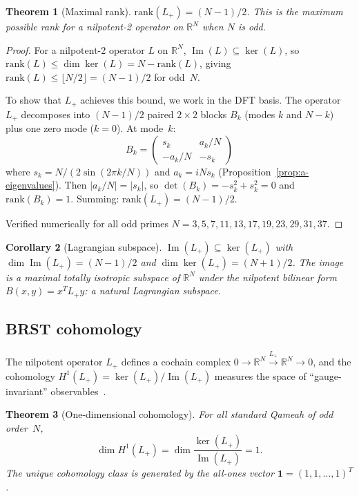 \documentclass[aip,jmp,reprint,superscriptaddress,floatfix,nofootinbib]{revtex4-2}
\newtheorem{theorem}{Theorem}
\newtheorem{corollary}[theorem]{Corollary}
\theoremstyle{definition}
\theoremstyle{remark}
\begin{document}
\begin{theorem}[Maximal rank]
\label{thm:maxrank}
$\mathrm{rank}(L_+) = (N{-}1)/2$.  This is the maximum possible rank
for a nilpotent-2 operator on $\mathbb{R}^N$ when $N$ is odd.
\end{theorem}

\begin{proof}
For a nilpotent-2 operator $L$ on $\mathbb{R}^N$,
$\operatorname{Im}(L) \subseteq \ker(L)$, so
$\mathrm{rank}(L) \leq \dim\ker(L) = N - \mathrm{rank}(L)$, giving
$\mathrm{rank}(L) \leq \lfloor N/2 \rfloor = (N{-}1)/2$ for odd~$N$.

To show that $L_+$ achieves this bound, we work in the DFT basis.
The operator $L_+$ decomposes into $(N{-}1)/2$ paired $2\times 2$
blocks $B_k$ (modes $k$ and $N{-}k$) plus one zero mode ($k=0$).
At mode~$k$:
\[
  B_k = \begin{pmatrix} s_k & a_k/N \\ -a_k/N & -s_k \end{pmatrix}
\]
where $s_k = N/(2\sin(2\pi k/N))$ and $a_k = iNs_k$
(Proposition~\ref{prop:a-eigenvalues}).  Then $|a_k/N| = |s_k|$, so
$\det(B_k) = -s_k^2 + s_k^2 = 0$ and $\mathrm{rank}(B_k) = 1$.
Summing: $\mathrm{rank}(L_+) = (N{-}1)/2$.

Verified numerically for all odd primes $N = 3, 5, 7, 11, 13, 17, 19,
23, 29, 31, 37$.
\end{proof}

\begin{corollary}[Lagrangian subspace]
\label{cor:lagrangian}
$\operatorname{Im}(L_+) \subseteq \ker(L_+)$ with
$\dim\operatorname{Im}(L_+) = (N{-}1)/2$
and $\dim\ker(L_+) = (N{+}1)/2$.
The image is a maximal totally isotropic subspace of $\mathbb{R}^N$
under the nilpotent bilinear form $B(x,y) = x^T L_+ y$: a natural
\emph{Lagrangian subspace}.
\end{corollary}

\subsection{BRST cohomology}

The nilpotent operator $L_+$ defines a cochain complex
$0 \to \mathbb{R}^N \xrightarrow{L_+} \mathbb{R}^N \to 0$, and
the cohomology $H^1(L_+) = \ker(L_+)/\operatorname{Im}(L_+)$ measures
the space of ``gauge-invariant'' observables~\cite{becchi,henneaux}.

\begin{theorem}[One-dimensional cohomology]
\label{thm:brst}
For all standard Qameah of odd order~$N$,
\begin{equation}\label{eq:brst-dim}
  \dim H^1(L_+) = \dim\frac{\ker(L_+)}{\operatorname{Im}(L_+)} = 1.
\end{equation}
The unique cohomology class is generated by the all-ones vector
$\mathbf{1} = (1,1,\ldots,1)^T$.
\end{theorem}
\end{document}
